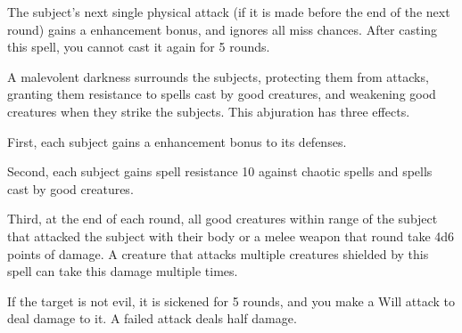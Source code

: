 \spelleffect The subject's next single physical attack (if it is made before the end of the next round) gains a  enhancement bonus, and ignores all miss chances. After casting this spell, you cannot cast it again for 5 rounds.

\begin{comment}
\subsubsection{U-Z}
\end{comment}

\spelldur{\durshort \dismissable}
\spelleffect A malevolent darkness surrounds the subjects, protecting them from attacks, granting them resistance to spells cast by good creatures, and weakening good creatures when they strike the subjects. This abjuration has three effects.
\par First, each subject gains a  enhancement bonus to its defenses.
\par Second, each subject gains spell resistance 10 against chaotic spells and spells cast by good creatures.
\par Third, at the end of each round, all good creatures within \rngclose range of the subject that attacked the subject with their body or a melee weapon that round take 4d6 points of damage. A creature that attacks multiple creatures shielded by this spell can take this damage multiple times.

\spelleffect If the target is not evil, it is sickened for 5 rounds, and you make a Will attack to deal damage to it. A failed attack deals half damage.

